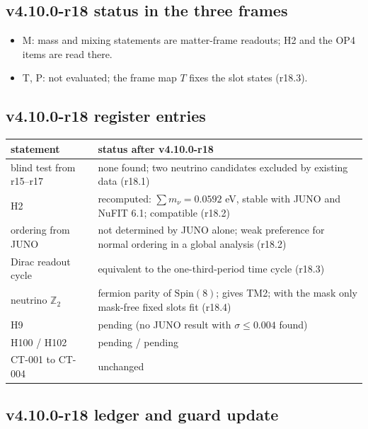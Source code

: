 \subsection*{v4.10.0-r18 status in the three frames}
\label{subsec:v4100-r18-frames}

\begin{itemize}[leftmargin=2em]
\item M: mass and mixing statements are matter-frame readouts; H2 and the OP4 items are read there.
\item T, P: not evaluated; the frame map \(T\) fixes the slot states (r18.3).
\end{itemize}

\subsection*{v4.10.0-r18 register entries}
\label{subsec:v4100-r18-register}

\begin{center}
\small
\begin{tabular}{@{}>{\raggedright\arraybackslash}p{}>{\raggedright\arraybackslash}p{}@{}}
\toprule
statement & status after v4.10.0-r18\\
\midrule
blind test from r15--r17 & none found; two neutrino candidates excluded by existing data (r18.1)\\
H2 & recomputed: \(\sum m_\nu=0.0592\) eV, stable with JUNO and NuFIT 6.1; compatible (r18.2)\\
ordering from JUNO & not determined by JUNO alone; weak preference for normal ordering in a global analysis (r18.2)\\
Dirac readout cycle & equivalent to the one-third-period time cycle (r18.3)\\
neutrino \(\mathbb Z_2\) & fermion parity of \(\mathrm{Spin}(8)\); gives TM2; with the mask only mask-free fixed slots fit (r18.4)\\
H9 & pending (no JUNO result with \(\sigma\le0.004\) found)\\
H100 / H102 & pending / pending\\
CT-001 to CT-004 & unchanged\\
\bottomrule
\end{tabular}
\end{center}

\subsection*{v4.10.0-r18 ledger and guard update}
\label{subsec:v4100-r18-ledger-guard}

